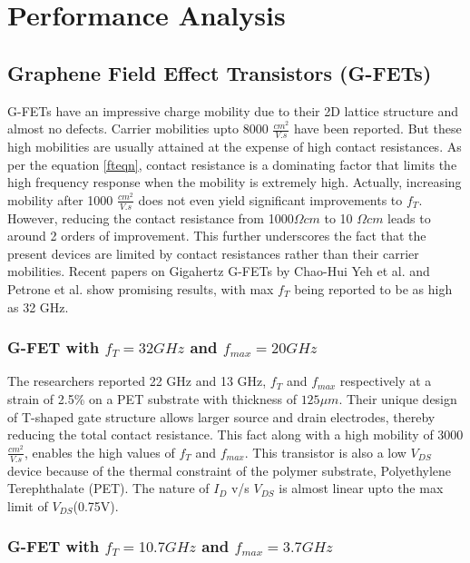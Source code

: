 \documentclass[a4paper,11pt]{article}
\begin{document}
\section{Performance Analysis}
\subsection{Graphene Field Effect Transistors (G-FETs)}
G-FETs have an impressive charge mobility due to their 2D lattice structure and almost no defects. Carrier mobilities upto 8000 $\frac{cm^2}{V.s}$ \cite{kim2009realization} have been reported. But these high mobilities are usually attained at the expense of high contact resistances. As per the equation \ref{fteqn}, contact resistance is a dominating factor that limits the high frequency response when the mobility is extremely high. Actually, increasing mobility after 1000 $\frac{cm^2}{V.s}$ does not even yield significant improvements to $f_T$. However, reducing the contact resistance from 1000$\Omega cm$ to 10 $\Omega cm$ leads to around 2 orders of improvement. This further underscores the fact that the present devices are limited by contact resistances rather than their carrier mobilities. Recent papers on Gigahertz G-FETs by Chao-Hui Yeh et al.\cite{yeh2014gigahertz} and Petrone et al.\cite{petrone2012graphene} show promising results, with max $f_T$ being reported to be as high as 32 GHz. 

\subsubsection{G-FET with $f_T =32 GHz$   and $f_{max} = 20GHz$ \cite{yeh2014gigahertz} } 

The researchers reported 22 GHz and 13 GHz, $f_T$  and $f_{max}$ respectively at a strain of 2.5\% on a PET substrate with thickness of $125\mu m$. Their unique design of T-shaped gate structure allows larger source and drain electrodes, thereby reducing the total contact resistance. This fact along with a high mobility of 3000 $\frac{cm^2}{V.s}$, enables the high values of $f_T$  and $f_{max}$. This transistor is also a low $V_{DS}$ device because of the thermal constraint of the polymer substrate, Polyethylene Terephthalate (PET). The nature of $I_D$ v/s $V_{DS}$ is almost linear upto the max limit of $V_{DS}$(0.75V).  

\subsubsection{G-FET with $f_T =10.7 GHz$   and $f_{max} = 3.7GHz$ \cite{petrone2012graphene}}
\end{document}
